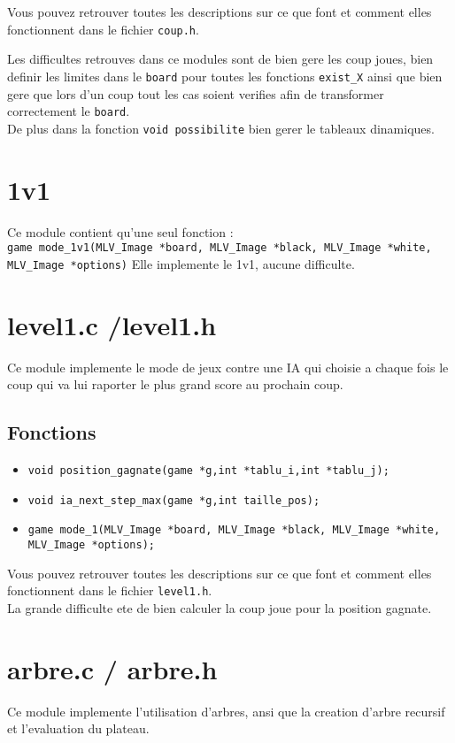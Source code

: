 \documentclass[11pt,a4paper]{article}
\begin{document}
Vous pouvez retrouver toutes les descriptions sur ce que font et comment elles fonctionnent dans le fichier \texttt{coup.h}.

Les difficultes retrouves dans ce modules sont de bien gere les coup joues, bien definir les limites dans le \texttt{board} pour toutes les fonctions \texttt{exist\_X} ainsi que bien gere que lors d'un coup tout les cas soient verifies afin de transformer correctement le \texttt{board}.\\
De plus dans la fonction \texttt{void possibilite} bien gerer le tableaux dinamiques.

\section{1v1}
Ce module contient qu'une seul fonction :\\
\texttt{game mode\_1v1(MLV\_Image *board, MLV\_Image *black, MLV\_Image *white, MLV\_Image *options)}
Elle implemente le 1v1, aucune difficulte.

\section{level1.c /level1.h}
Ce module implemente le mode de jeux contre une IA qui choisie a chaque fois le coup qui va lui raporter le plus grand score au prochain coup.
\subsection{Fonctions}
\begin{itemize}

\item \texttt{void position\_gagnate(game *g,int *tablu\_i,int *tablu\_j);}
\item \texttt{void ia\_next\_step\_max(game *g,int taille\_pos);}
\item \texttt{game mode\_1(MLV\_Image *board, MLV\_Image *black, MLV\_Image *white, MLV\_Image *options);}

\end{itemize}

Vous pouvez retrouver toutes les descriptions sur ce que font et comment elles fonctionnent dans le fichier \texttt{level1.h}.\\

La grande difficulte ete de bien calculer la coup joue pour la position gagnate.
\newpage
\section{arbre.c / arbre.h}
Ce module implemente l'utilisation d'arbres, ansi que la creation d'arbre recursif et l'evaluation du plateau.
\end{document}
